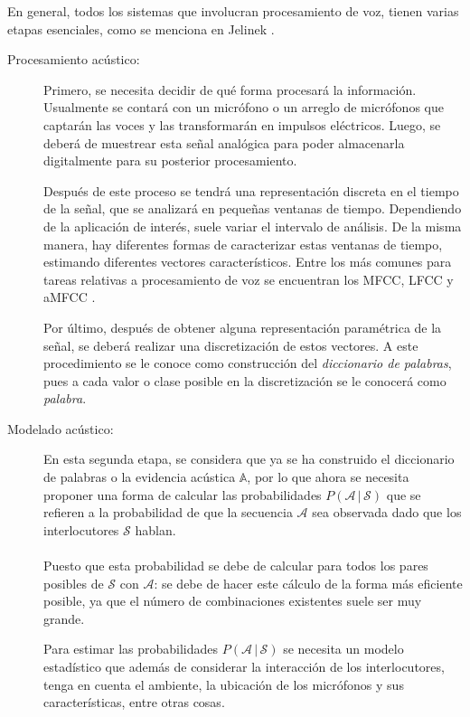 En general, todos los sistemas que involucran procesamiento de voz, tienen varias etapas esenciales, como se menciona en Jelinek \cite{Jelinek1998}. 

\begin{description}
\item[Procesamiento acústico:]
Primero, se necesita decidir de qué forma procesará la información. Usualmente se contará con un micrófono o un arreglo de micrófonos que captarán las voces y las transformarán en impulsos eléctricos. Luego, se deberá de muestrear esta señal analógica para poder almacenarla digitalmente para su posterior procesamiento. 

Después de este proceso se tendrá una representación discreta en el tiempo de la señal, que se analizará en pequeñas ventanas de tiempo. Dependiendo de la aplicación de interés, suele variar el intervalo de análisis. De la misma manera, hay diferentes formas de caracterizar estas ventanas de tiempo, estimando diferentes vectores característicos. Entre los más comunes para tareas relativas a procesamiento de voz se encuentran los \acs{MFCC}, \acs{LFCC} \cite{Davis1980} y \acs{aMFCC} \cite{Lei2009}. 

Por último, después de obtener alguna representación paramétrica de la señal, se deberá realizar una discretización de estos vectores. A este procedimiento se le conoce como construcción del \textit{diccionario de palabras}, pues a cada valor o clase posible en la discretización se le conocerá como \textit{palabra}.

\item[Modelado acústico:] 
En esta segunda etapa, se considera que ya se ha construido el diccionario de palabras o la evidencia acústica $\mathbb{A}$, por lo que ahora se necesita proponer una forma de calcular las probabilidades $P(\mathcal{A} \,|\, \mathcal{S})$ que se refieren a la probabilidad de que la secuencia $\mathcal{A}$ sea observada dado que los interlocutores $\mathcal{S}$ hablan. 
\\~\\
Puesto que esta probabilidad se debe de calcular para todos los pares posibles de $\mathcal{S}$ con $\mathcal{A}$: se debe de hacer este cálculo de la forma más eficiente posible, ya que el número de combinaciones existentes suele ser muy grande.

Para estimar las probabilidades $P(\mathcal{A} \,|\, \mathcal{S})$ se necesita un modelo estadístico que además de considerar la interacción de los interlocutores, tenga en cuenta el ambiente, la ubicación de los micrófonos y sus características, entre otras cosas.


\end{description}
